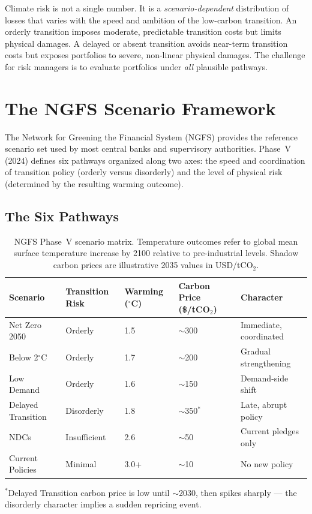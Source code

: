 \documentclass[11pt, a4paper]{article}
\theoremstyle{definition}
\theoremstyle{plain}
\theoremstyle{remark}
\begin{document}
\begin{keyidea}
Climate risk is not a single number.
It is a \emph{scenario-dependent} distribution of losses that varies with the
speed and ambition of the low-carbon transition.
An orderly transition imposes moderate, predictable transition costs but limits
physical damages.
A delayed or absent transition avoids near-term transition costs but exposes
portfolios to severe, non-linear physical damages.
The challenge for risk managers is to evaluate portfolios under \emph{all}
plausible pathways.
\end{keyidea}


\section{The NGFS Scenario Framework}
\label{sec:ngfs}

The Network for Greening the Financial System (NGFS) provides the reference
scenario set used by most central banks and supervisory authorities.
Phase~V (2024) defines six pathways organized along two axes: the speed and
coordination of transition policy (orderly versus disorderly) and the level of
physical risk (determined by the resulting warming outcome).

\subsection{The Six Pathways}

\begin{table}[H]
\centering
\caption{NGFS Phase~V scenario matrix. Temperature outcomes refer to global
mean surface temperature increase by 2100 relative to pre-industrial levels.
Shadow carbon prices are illustrative 2035 values in USD/tCO$_2$.}
\label{tab:ngfs-scenarios}
\begin{tabular}{@{}p{3.2cm}p{2.0cm}p{1.8cm}p{1.8cm}p{3.5cm}@{}}
\toprule
\textbf{Scenario} & \textbf{Transition Risk} & \textbf{Warming ($^\circ$C)} &
\textbf{Carbon Price (\$/tCO$_2$)} & \textbf{Character} \\
\midrule
Net Zero 2050       & Orderly    & 1.5 & $\sim$300 & Immediate, coordinated \\[4pt]
Below 2$^\circ$C    & Orderly    & 1.7 & $\sim$200 & Gradual strengthening \\[4pt]
Low Demand          & Orderly    & 1.6 & $\sim$150 & Demand-side shift \\[4pt]
Delayed Transition  & Disorderly & 1.8 & $\sim$350$^*$ & Late, abrupt policy \\[4pt]
NDCs                & Insufficient & 2.6 & $\sim$50 & Current pledges only \\[4pt]
Current Policies    & Minimal    & 3.0+ & $\sim$10  & No new policy \\
\bottomrule
\end{tabular}

\smallskip
\footnotesize{$^*$Delayed Transition carbon price is low until $\sim$2030, then
spikes sharply --- the disorderly character implies a sudden repricing event.}
\end{table}
\end{document}
